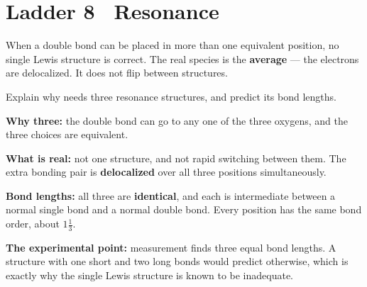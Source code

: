 \documentclass{apchem-worksheet}
\begin{document}
\section*{\sffamily Ladder 8 \textbullet\ Resonance}

When a double bond can be placed in more than one equivalent position, no
single Lewis structure is correct. The real species is the
\textbf{average} --- the electrons are delocalized. It does not flip
between structures.

\begin{workedexample}
Explain why  needs three resonance structures, and predict its
bond lengths.

\textbf{Why three:} the double bond can go to any one of the three
oxygens, and the three choices are equivalent.

\textbf{What is real:} not one structure, and not rapid switching between
them. The extra bonding pair is \textbf{delocalized} over all three
 positions simultaneously.

\textbf{Bond lengths:} all three are \textbf{identical}, and each is
intermediate between a normal  single bond and a normal 
double bond. Every position has the same bond order, about
$1\tfrac{1}{3}$.

\textbf{The experimental point:} measurement finds three equal bond
lengths. A structure with one short and two long bonds would predict
otherwise, which is exactly why the single Lewis structure is known to be
inadequate.
\end{workedexample}
\end{document}
